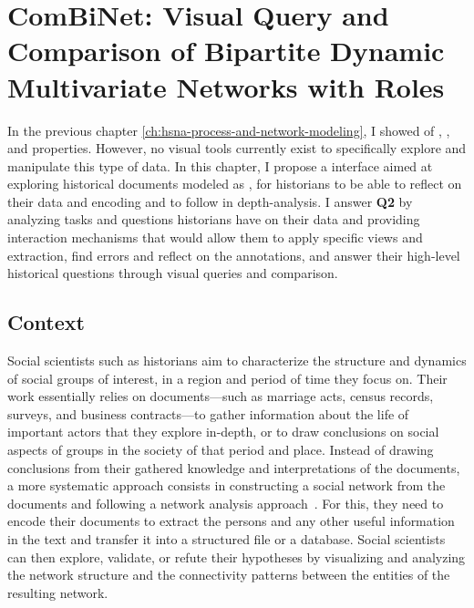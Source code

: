\chapter{ComBiNet: Visual Query and Comparison of Bipartite Dynamic Multivariate Networks with Roles}\label{ch:combinet}
\minitoc

In the previous chapter \autoref{ch:hsna-process-and-network-modeling}, I showed  of \traceability, \reality, and \simplicity properties.
However, no visual tools currently exist to specifically explore and manipulate this type of data.
In this chapter, I propose a \va interface aimed at exploring historical documents modeled as \modelplural, for historians to be able to reflect on their data and encoding and to follow in depth-analysis.
I answer \textbf{Q2} by analyzing tasks and questions historians have on their data and providing interaction mechanisms that would allow them to apply specific views and extraction, find errors and reflect on the annotations, and answer their high-level historical questions through visual queries and comparison.


\section{Context}

Social scientists such as historians aim to characterize the structure and dynamics of social groups of interest, in a region and period of time they focus on\cite{tilly1984retrieving}.
Their work essentially relies on documents---such as marriage acts, census records, surveys, and business contracts---to gather information about the life of important actors that they explore in-depth, or to draw conclusions on social aspects of groups in the society of that period and place.
Instead of drawing conclusions from their gathered knowledge and interpretations of the documents, a more systematic approach consists in constructing a social network from the documents and following a network analysis approach~\cite{wetherellHistoricalSocialNetwork1998}.
For this, they need to encode their documents to extract the persons and any other useful information in the text and transfer it into a structured file or a database.
Social scientists can then explore, validate, or refute their hypotheses by visualizing and analyzing the network structure and the connectivity patterns between the entities of the resulting network.

